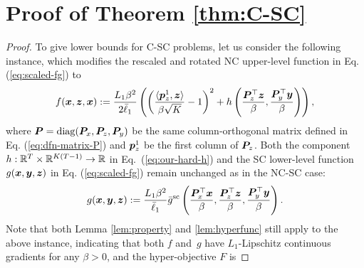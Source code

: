 \section{Proof of Theorem \ref{thm:C-SC}} \label{apx:proof-thm-CSC}



\begin{proof}
To give lower bounds for C-SC problems, let us consider the following instance, which modifies the rescaled and rotated NC upper-level function in Eq. (\ref{eq:scaled-fg}) to
\begin{align} \label{eq:our-f-convex}
    f({\bm{x}},{\bm{z}},{\bm{x}}) :=  \frac{L_1 \beta^2}{2\bar \ell_1} \left(
    \left( \frac{\langle {\bm{p}}_z^1, {\bm{z}}\rangle}{\beta \sqrt{K}} - 1 \right)^2 + h\left(\frac{{\bm{P}}_z^\top {\bm{z}}}{\beta},\frac{{\bm{P}}_y^\top {\bm{y}}}{\beta} \right) \right),
\end{align}
where ${\bm{P}} = {\rm diag}({\bm{P}}_x, {\bm{P}}_z, {\bm{P}}_y)$ be the same column-orthogonal matrix defined in Eq. (\ref{eq:dfn-matrix-P}) and ${\bm{p}}_z^1$ be the first column of ${\bm{P}}_z$. Both the component $h: {\mathbb{R}}^T \times {\mathbb{R}}^{K(T-1)} \rightarrow {\mathbb{R}}$ in Eq.~(\ref{eq:our-hard-h}) and the SC lower-level function $g({\bm{x}},{\bm{y}},{\bm{z}}) $ in Eq. (\ref{eq:scaled-fg}) remain unchanged as in the NC-SC case:
\begin{align*}
    g({\bm{x}},{\bm{y}},{\bm{z}}) := \frac{L_1 \beta^2}{\bar \ell_1} \bar g^{\rm sc} \left( \frac{{\bm{P}}_x^\top {\bm{x}}}{\beta}, \frac{{\bm{P}}_z^\top {\bm{z}}}{\beta}, \frac{{\bm{P}}_y^\top {\bm{y}}}{\beta} \right).
\end{align*}
Note that both
Lemma \ref{lem:property} and \ref{lem:hyperfunc} still apply to the above instance, indicating that both 
$f$ and~$g$ have $L_1$-Lipschitz continuous gradients for any $\beta>0$, and the hyper-objective $F$ is 

\end{proof}
